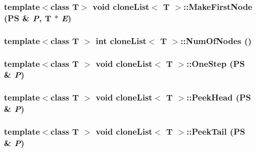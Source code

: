 \hypertarget{classclone_list_acf959c1920c2b448fa4f68c35ce90044}{
\subsubsection[{MakeFirstNode}]{\setlength{\rightskip}{0pt plus 5cm}template$<$class T$>$ void {\bf cloneList}$<$ T $>$::MakeFirstNode ({\bf PS} \& {\em P}, \/  T $\ast$ {\em E})}}
\label{classclone_list_acf959c1920c2b448fa4f68c35ce90044}
\hypertarget{classclone_list_a8f54a13007e33d1a1f08f77a0bd70927}{
\subsubsection[{NumOfNodes}]{\setlength{\rightskip}{0pt plus 5cm}template$<$class T $>$ int {\bf cloneList}$<$ T $>$::NumOfNodes ()}}
\label{classclone_list_a8f54a13007e33d1a1f08f77a0bd70927}
\hypertarget{classclone_list_a2e89afbba3e4eb248912cc2bd1830e7f}{
\subsubsection[{OneStep}]{\setlength{\rightskip}{0pt plus 5cm}template$<$class T $>$ void {\bf cloneList}$<$ T $>$::OneStep ({\bf PS} \& {\em P})}}
\label{classclone_list_a2e89afbba3e4eb248912cc2bd1830e7f}
\hypertarget{classclone_list_a2780cfb6574e5cd9b8797b1b5c8c9ad6}{
\subsubsection[{PeekHead}]{\setlength{\rightskip}{0pt plus 5cm}template$<$class T $>$ void {\bf cloneList}$<$ T $>$::PeekHead ({\bf PS} \& {\em P})}}
\label{classclone_list_a2780cfb6574e5cd9b8797b1b5c8c9ad6}
\hypertarget{classclone_list_a5c93719d6da05ac5249e8535c5c644d8}{
\subsubsection[{PeekTail}]{\setlength{\rightskip}{0pt plus 5cm}template$<$class T $>$ void {\bf cloneList}$<$ T $>$::PeekTail ({\bf PS} \& {\em P})}}

